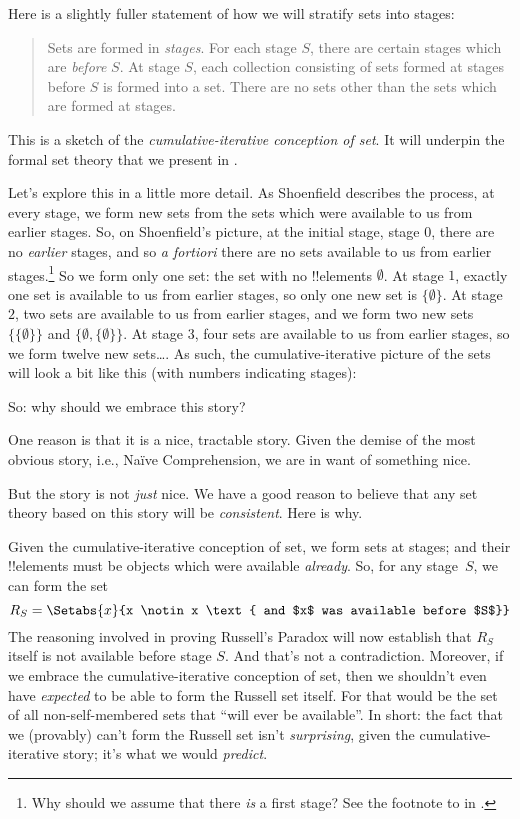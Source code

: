 \documentclass[../../../include/open-logic-section]{subfiles}
\begin{document}

Here is a slightly fuller statement of how we will stratify sets into
stages:
\begin{quote}
	Sets are formed in \emph{stages}. For each stage $S$, there are
	certain stages which are \emph{before} $S$. At stage $S$, each
	collection consisting of sets formed at stages before $S$ is
	formed into a set. There are no sets other than the sets which are
	formed at stages. \cite[p.~323]{Shoenfield:AST}
\end{quote} 
This is a sketch of the \emph{cumulative-iterative conception of
set}. It will underpin the formal set theory that we present in
. 

Let's explore this in a little more detail. As Shoenfield describes
the process, at every stage, we form new sets from the {sets} which
were available to us from earlier stages. So, on Shoenfield's picture,
at the initial stage, stage $0$, there are no \emph{earlier} stages,
and so \emph{a fortiori} there are no sets available to us from
earlier stages.\footnote{Why should we assume that there \emph{is} a
first stage? See the footnote to \stagesord{} in
.} So we form only one set: the set
with no !!{element}s $\emptyset$. At stage $1$, exactly one set is
available to us from earlier stages, so only one new set is
$\{\emptyset\}$. At stage $2$, two sets are available to us from
earlier stages, and we form two new sets $\{\{\emptyset\}\}$ and
$\{\emptyset, \{\emptyset\}\}$. At stage $3$, four sets are available
to us from earlier stages, so we form twelve new sets\ldots. As such,
the cumulative-iterative  picture of the sets will look a bit like
this (with numbers indicating stages):
\begin{center}
\end{center}
So: why should we embrace this story? 

One reason is that it is a nice, tractable story. Given the demise of
the most obvious story, i.e., Na\"ive Comprehension, we are in want of
something nice. 

But the story is not \emph{just} nice. We have a good reason to
believe that any set theory based on this story will be
\emph{consistent}. Here is why. 

Given the cumulative-iterative conception of set, we form sets at
stages; and their !!{element}s must be objects which were available
\emph{already}. So, for any stage~$S$, we can form the set 
\[
	R_S = \Setabs{x}{x \notin x \text{ and $x$ was available before $S$}}
\]
The reasoning involved in proving Russell's Paradox will now establish
that $R_S$ itself is not available before stage $S$. And that's not a
contradiction. Moreover, if we embrace the cumulative-iterative
conception of set, then we shouldn't even have \emph{expected} to be
able to form the Russell set itself. For that would be the set of all
non-self-membered sets that ``will ever be available''. In short: the
fact that we (provably) can't form the Russell set isn't
\emph{surprising}, given the cumulative-iterative story; it's what we
would \emph{predict}.
\end{document}

